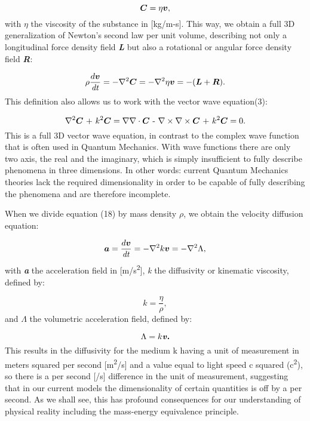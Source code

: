 \documentclass[a4paper]{article}
\newcommand\textstyleNone[1]{#1}
\newcounter{Text}
\newcommand\boldsubformula[1]{\text{\mathversion{bold}$#1$}}
\begin{document}
\begin{equation}
\boldsubformula C=\eta \boldsubformula v,
\end{equation}
{
\textstyleNone{{with $\eta
$}}{ the viscosity of the substance in [kg/m-s]. This way, we
obtain} a full 3D generalization of Newton's second law per unit volume, describing not only a longitudinal force
density field \textbf{\textit{L}} but also a rotational or angular force density field \textbf{\textit{R}}: }

\begin{equation}\label{seq:refText18}
\rho \frac{d\boldsubformula v}{\mathit{dt}}=-{\nabla}^2\boldsubformula C=-{\nabla}^2\eta \boldsubformula
v=-(\boldsubformula L+\boldsubformula R).
\end{equation}
This definition also allows us to work with the vector wave equation(3):

\begin{equation}
{\nabla}^2\boldsubformula C\text{ + }k^2\boldsubformula C=\nabla \nabla \cdot \boldsubformula C\text{ - }\nabla \times
\nabla \times \boldsubformula C\text{ + }k^2\boldsubformula C=0.
\end{equation}
{
This is a full 3D vector wave equation, in contrast to the complex wave function that is often used in Quantum
Mechanics. With wave functions there are only two axis, the real and the imaginary, which is simply insufficient to
fully describe phenomena in three dimensions. In other words: current Quantum Mechanics theories lack the required
dimensionality in order to be capable of fully describing the phenomena and are therefore incomplete. }

When we divide equation (18) by mass density $\rho $, we obtain the velocity diffusion equation:

\begin{equation}\label{seq:refText20}
\boldsubformula a=\frac{d\boldsubformula v}{\mathit{dt}}=-{\nabla}^2k\boldsubformula v=-{\nabla}^2\Lambda ,
\end{equation}
with \textbf{\textit{a}} the acceleration field in [m/s\textsuperscript{2}], \textit{k} the diffusivity or kinematic
viscosity, defined by:

\begin{equation}
k=\frac{\eta }{\rho },
\end{equation}
and $\Lambda $ the volumetric acceleration field, defined by: 

\begin{equation}
\Lambda =k\boldsubformula{\mathit{v.}}
\end{equation}
This results in the diffusivity for the medium k having a unit of measurement in meters squared per second
[m\textsuperscript{2}/s] and a value equal to light speed c squared (c\textsuperscript{2}), so there is a per second
[/s] difference in the unit of measurement, suggesting that in our current models the dimensionality of certain
quantities is off by a per second. As we shall see, this has profound consequences for our understanding of physical
reality including the mass-energy equivalence principle. 
\end{document}
